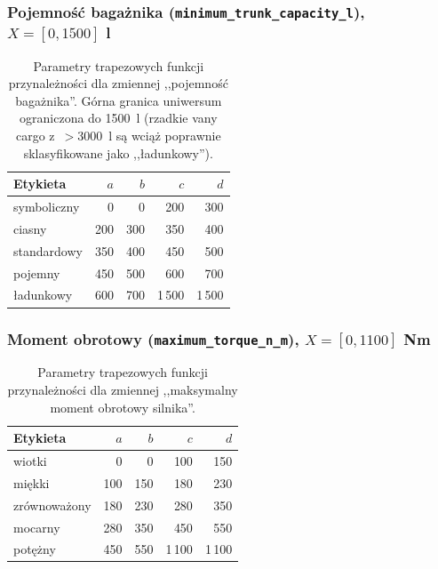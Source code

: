 \documentclass{article}
\begin{document}
\subsubsection{Pojemność bagażnika (\texttt{minimum\_trunk\_capacity\_l}), $X = [0, 1500]$ l}
\begin{table}[H]
\centering
\caption{Parametry trapezowych funkcji przynależności dla zmiennej
,,pojemność bagażnika''. Górna granica uniwersum ograniczona do
1500~l (rzadkie vany cargo z~$>$3000~l są wciąż poprawnie
sklasyfikowane jako ,,ładunkowy'').}
\label{tab:mf-trunk}
\begin{tabular}{l r r r r}
\toprule
Etykieta & $a$ & $b$ & $c$ & $d$ \\
\midrule
symboliczny   &   0 &   0 & 200 & 300 \\
ciasny        & 200 & 300 & 350 & 400 \\
standardowy   & 350 & 400 & 450 & 500 \\
pojemny       & 450 & 500 & 600 & 700 \\
ładunkowy     & 600 & 700 & 1\,500 & 1\,500 \\
\bottomrule
\end{tabular}
\end{table}

\subsubsection{Moment obrotowy (\texttt{maximum\_torque\_n\_m}), $X = [0, 1100]$ Nm}
\begin{table}[H]
\centering
\caption{Parametry trapezowych funkcji przynależności dla zmiennej
,,maksymalny moment obrotowy silnika''.}
\label{tab:mf-torque}
\begin{tabular}{l r r r r}
\toprule
Etykieta & $a$ & $b$ & $c$ & $d$ \\
\midrule
wiotki        &   0 &   0 & 100 & 150 \\
miękki        & 100 & 150 & 180 & 230 \\
zrównoważony  & 180 & 230 & 280 & 350 \\
mocarny       & 280 & 350 & 450 & 550 \\
potężny       & 450 & 550 & 1\,100 & 1\,100 \\
\bottomrule
\end{tabular}
\end{table}
\end{document}
